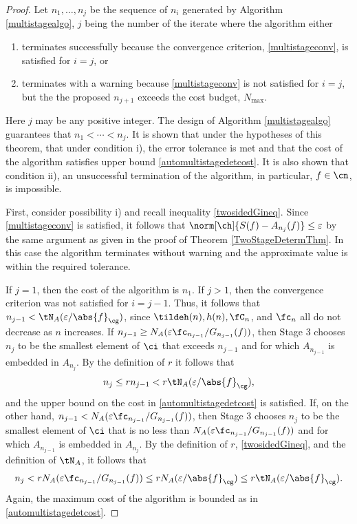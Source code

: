 \documentclass[]{elsarticle}
\theoremstyle{definition}
\theoremstyle{remark}
\newcommand{\Gnorm}[1]{\abs{#1}_{\cg}}
\begin{document}
\begin{proof} Let $n_1, \ldots, n_{j}$ be the sequence of $n_i$ generated by Algorithm \ref{multistagealgo}, $j$ being the number of the iterate where the algorithm either 
\begin{enumerate}
\renewcommand{\labelenumi}{\roman{enumi})}
\item terminates successfully because the convergence criterion, \eqref{multistageconv}, is satisfied for $i=j$, or 

\item terminates with a warning because \eqref{multistageconv} is not satisfied for $i=j$, but the the proposed $n_{j+1}$ exceeds the cost budget, $N_{\max}$. 

\end{enumerate}
Here $j$ may be any positive integer.  The design of Algorithm \ref{multistagealgo} guarantees that $n_1 < \cdots < n_j$.  It is shown that under the hypotheses of this theorem, that under condition i), the error tolerance is met and that the cost of the algorithm satisfies upper bound \eqref{automultistagedetcost}. It is also shown that condition ii), an unsuccessful termination of the algorithm, in particular, $f \in \cn$, is impossible.  

First, consider possibility i) and recall inequality \eqref{twosidedGineq}.
Since \eqref{multistageconv} is satisfied, it follows that $\norm[\ch]{S(f)-A_{n_j}(f)} \le \varepsilon$ by the same argument as given in the proof of Theorem \ref{TwoStageDetermThm}.  In this case the algorithm terminates without warning and the approximate value is within the required tolerance.

If $j=1$, then the cost of the algorithm is $n_1$.  If $j>1$, then the convergence criterion was not satisfied for $i=j-1$. Thus, it follows that $n_{j-1} < \tN_A(\varepsilon/\Gnorm{f})$, since $\tildeh(n), h(n), \fC_n$, and $\fc_n$ all do not decrease as $n$ increases. 
If $n_{j-1} \ge N_{A}(\varepsilon \fc_{n_{j-1}}/G_{n_{j-1}}(f))$, then Stage 3 chooses $n_{j}$ to be the smallest element of $\ci$ that exceeds $n_{j-1}$ and for which $A_{n_{j-1}}$ is embedded in $A_{n_j}$.  By the definition of $r$ it follows that
\begin{equation*}
n_{j} \le r  n_{j-1} < r \tN_{A}(\varepsilon/\Gnorm{f}),
\end{equation*}
and the upper bound on the cost in \eqref{automultistagedetcost} is satisfied.
If, on the other hand, $n_{j-1} < N_{A}(\varepsilon \fc_{n_{j-1}}/G_{n_{j-1}}(f))$, then Stage 3 chooses $n_{j}$ to be the smallest element of $\ci$ that is no less than $N_{A}(\varepsilon \fc_{n_{j-1}}/G_{n_{j-1}}(f))$ and for which $A_{n_{j-1}}$ is embedded in $A_{n_j}$.  By the definition of $r$, \eqref{twosidedGineq}, and the definition of $\tN_A$, it follows that
\begin{equation*}
n_{j} < r  N_{A}(\varepsilon \fc_{n_{j-1}}/G_{n_{j-1}}(f)) \le r  N_{A}(\varepsilon/\Gnorm{f}) \le r \tN_{A}(\varepsilon/\Gnorm{f}).
\end{equation*}
Again, the maximum cost of the algorithm is bounded as in \eqref{automultistagedetcost}.


\end{proof}
\end{document}
